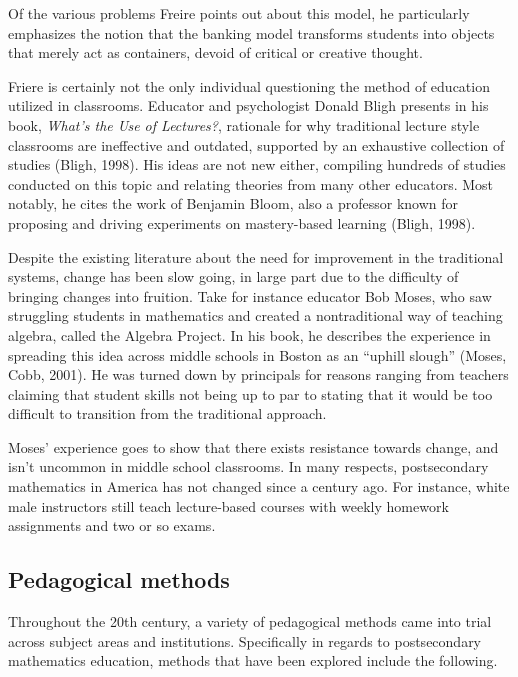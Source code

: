 Of the various problems Freire points out about this model, he particularly emphasizes the notion that the banking model transforms students into objects that merely act as containers, devoid of critical or creative thought.

Friere is certainly not the only individual questioning the method of education utilized in classrooms. Educator and psychologist Donald Bligh presents in his book, {\it What's the Use of Lectures?}, rationale for why traditional lecture style classrooms are ineffective and outdated, supported by an exhaustive collection of studies (Bligh, 1998). His ideas are not new either, compiling hundreds of studies conducted on this topic and relating theories from many other educators. Most notably, he cites the work of Benjamin Bloom, also a professor known for proposing and driving experiments on mastery-based learning (Bligh, 1998).

Despite the existing literature about the need for improvement in the traditional systems, change has been slow going, in large part due to the difficulty of bringing changes into fruition. Take for instance educator Bob Moses, who saw struggling students in mathematics and created a nontraditional way of teaching algebra, called the Algebra Project. In his book, he describes the experience in spreading this idea across middle schools in Boston as an ``uphill slough'' (Moses, Cobb, 2001). He was turned down by principals for reasons ranging from teachers claiming that student skills not being up to par to stating that it would be too difficult to transition from the traditional approach.

Moses' experience goes to show that there exists resistance towards change, and isn't uncommon in middle school classrooms. In many respects, postsecondary mathematics in America has not changed since a century ago. For instance, white male instructors still teach lecture-based courses with weekly homework assignments and two or so exams.

\subsection{Pedagogical methods}
Throughout the 20th century, a variety of pedagogical methods came into trial across subject areas and institutions. Specifically in regards to postsecondary mathematics education, methods that have been explored include the following.

